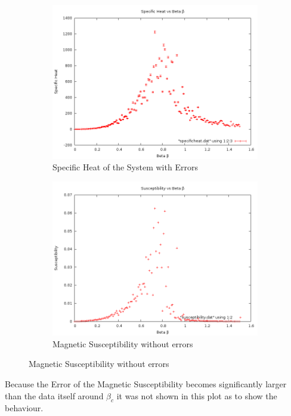 \documentclass[12pt,a4paper,notitlepage,twoside]{article}
\begin{document}
\begin{figure}[H]
\centering
	\begin{subfigure}[b]{0.45\textwidth}
		\includegraphics[width=\textwidth]{q2d20/specificheat.png}	
		\caption{Specific Heat of the System with Errors}
	\end{subfigure}
	\begin{subfigure}[b]{0.45\textwidth}
		\includegraphics[width=\textwidth]{q2d20/susceptibility.png}
		\caption{Magnetic Susceptibility without errors}
	\end{subfigure}
\end{figure}

Because the Error of the Magnetic Susceptibility becomes significantly larger than the data itself around $\beta_c$ it was not shown in this plot as to show the behaviour.
\end{document}
